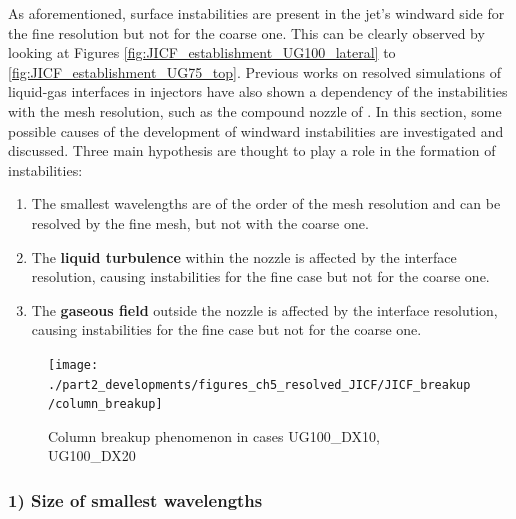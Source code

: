 As aforementioned, surface instabilities are present in the jet's windward side for the fine resolution but not for the coarse one. This can be clearly observed by looking at Figures \ref{fig:JICF_establishment_UG100_lateral} to \ref{fig:JICF_establishment_UG75_top}. Previous works on resolved simulations of liquid-gas interfaces in injectors have also shown a dependency of the instabilities with the mesh resolution, such as the compound nozzle of . In this section, some possible causes of the development of windward instabilities are investigated and discussed. Three main hypothesis are thought to play a role in the formation of instabilities:

\begin{enumerate}

	\item The smallest wavelengths are of the order of the mesh resolution and can be resolved by the fine mesh, but not with the coarse one.
	
	\item The \textbf{liquid turbulence} within the nozzle is affected by the interface resolution, causing instabilities for the fine case but not for the coarse one.
	
	\item The \textbf{gaseous field} outside the nozzle is affected by the interface resolution, causing instabilities for the fine case but not for the coarse one.

\end{enumerate}


\clearpage

\begin{figure}[ht]
\centering
\texttt{[image: ./part2\_developments/figures\_ch5\_resolved\_JICF/JICF\_breakup/column\_breakup]}
\caption{Column breakup phenomenon in cases UG100\_DX10, UG100\_DX20}
\label{fig:jicf_column_breakup_ug100}
\end{figure}


\subsubsection*{1) Size of smallest wavelengths}


